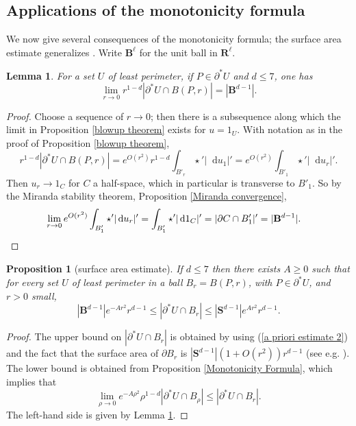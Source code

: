 \documentclass[reqno,12pt,letterpaper]{amsart}
\newcommand{\RR}{\mathbf{R}}
\newcommand{\Sph}{\mathbf S}
\newcommand{\Ball}{\mathbf{B}}
\newcommand*\dif{\mathop{}\!\mathrm{d}}
\newtheorem{lemma}[theorem]{Lemma}
\newtheorem{proposition}[theorem]{Proposition}
\theoremstyle{definition}
\numberwithin{equation}{section}
\begin{document}
\subsection{Applications of the monotonicity formula}
We now give several consequences of the monotonicity formula; the surface area estimate generalizes \cite[Remark 5.13]{Giusti77}.
Write $\Ball^\ell$ for the unit ball in $\RR^\ell$.

\begin{lemma}\label{least perimeter minimal size}
For a set $U$ of least perimeter, if $P \in \partial^* U$ and $d \leq 7$, one has
$$\lim_{r \to 0} r^{1 - d} |\partial^* U \cap B(P, r)| = |\Ball^{d - 1}|.$$
\end{lemma}
\begin{proof}
Choose a sequence of $r \to 0$; then there is a subsequence along which the limit in Proposition \ref{blowup theorem} exists for $u = 1_U$.
With notation as in the proof of Proposition \ref{blowup theorem},
$$r^{1 - d} |\partial^* U \cap B(P, r)| = e^{O(r^2)} r^{1 - d}\int_{B'_r} \star'|\dif u_1|' = e^{O(r^2)} \int_{B'_1} \star'|\dif u_r|'.$$
Then $u_r \to 1_C$ for $C$ a half-space, which in particular is transverse to $B'_1$.
So by the Miranda stability theorem, Proposition \ref{Miranda convergence},
\begin{align*}
\lim_{r \to 0} e^{O(r^2)} \int_{B'_1} \star'|\dif u_r|' &= \int_{B'_1} \star'|\dif 1_C|' = |\partial C \cap B'_1|' = |\Ball^{d - 1}|. \qedhere
\end{align*}
\end{proof}

\begin{proposition}[surface area estimate]\label{doubling dimension}
If $d \leq 7$ then there exists $A \geq 0$ such that for every set $U$ of least perimeter in a ball $B_r = B(P, r)$, with $P \in \partial^* U$, and $r > 0$ small,
$$|\Ball^{d - 1}|e^{-Ar^2}r^{d - 1} \leq |\partial^*U \cap B_r| \leq |\Sph^{d - 1}|e^{Ar^2} r^{d - 1}.$$
\end{proposition}
\begin{proof}
The upper bound on $|\partial^* U \cap B_r|$ is obtained by using (\ref{a priori estimate 2}) and the fact that the surface area of $\partial B_r$ is $|\Sph^{d - 1}|(1 + O(r^2))r^{d - 1}$ (see e.g. \cite{gray1974volume}).
The lower bound is obtained from Proposition \ref{Monotonicity Formula}, which implies that
$$\lim_{\rho \to 0} e^{-A\rho^2} \rho^{1 - d} |\partial^* U \cap B_\rho| \leq |\partial^* U \cap B_r|.$$
The left-hand side is given by Lemma \ref{least perimeter minimal size}.
\end{proof}
\end{document}
